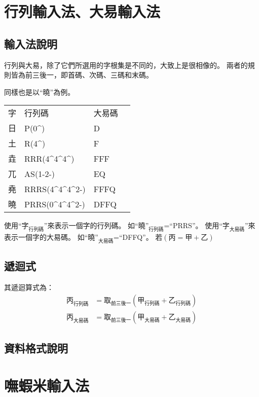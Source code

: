 \documentclass{article}
\def\tac{\textasciicircum}
\begin{document}
\section{行列輸入法、大易輸入法}
\subsection{輸入法說明}
行列與大易，除了它們所選用的字根集是不同的，大致上是很相像的。
兩者的規則皆為前三後一，即首碼、次碼、三碼和末碼。

同樣也是以``曉''為例。
\begin{tabular}{llll}
字  & 行列碼 & 大易碼\\
日  & P(0\tac) & D\\
土  & R(4\tac) & F\\
垚  & RRR(4\tac4\tac4\tac) & FFF\\
兀  & AS(1-2-) & EQ\\
堯  & RRRS(4\tac4\tac4\tac2-) & FFFQ\\
曉  & PRRS(0\tac4\tac4\tac2-) & DFFQ\\
\end{tabular}

使用``$\mbox{字}_{\mbox{行列碼}}$''來表示一個字的行列碼。
如$\mbox{``曉''}_{\mbox{行列碼}}$=``PRRS''。
使用``$\mbox{字}_{\mbox{大易碼}}$''來表示一個字的大易碼。
如$\mbox{``曉''}_{\mbox{大易碼}}$=``DFFQ''。
若$(\mbox{丙}=\mbox{甲}+\mbox{乙})$

\subsection{遞迴式}
其遞迴算式為：
\begin{subequations}
  \begin{align}
  \mbox{丙}_{\mbox{行列碼}}&=\mbox{取}_{\mbox{前三後一}}(\mbox{甲}_{\mbox{行列碼}}+\mbox{乙}_{\mbox{行列碼}})\\
  \mbox{丙}_{\mbox{大易碼}}&=\mbox{取}_{\mbox{前三後一}}(\mbox{甲}_{\mbox{大易碼}}+\mbox{乙}_{\mbox{大易碼}})
  \end{align}
\end{subequations}
\subsection{資料格式說明}

\section{嘸蝦米輸入法}
\end{document}
